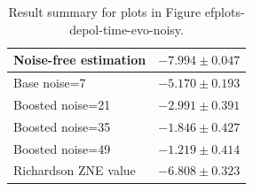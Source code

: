 \begin{table}
\caption{Result summary for plots in Figure 
ef{plots-depol-time-evo-noisy}.}
\begin{tabular*}{\textwidth}{@{\extracolsep{\fill}}ll@{}}
\toprule

Noise-free estimation & $-7.994 \pm 0.047$ \\
\midrule
Base noise=7 & $-5.170 \pm 0.193$ \\
Boosted noise=21 & $-2.991 \pm 0.391$ \\
Boosted noise=35 & $-1.846 \pm 0.427$ \\
Boosted noise=49 & $-1.219 \pm 0.414$ \\
\midrule
Richardson ZNE value & $-6.808 \pm 0.323$ \\
\bottomrule
\end{tabular*}
\label{table-dephasing-time-evo-noisy}
\end{table}
